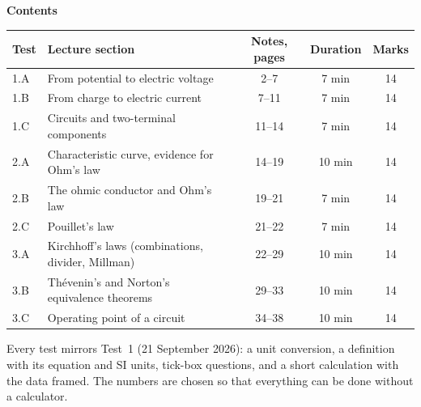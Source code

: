 \documentclass{ibetest}
\begin{document}
\vspace{6mm}
{\sffamily\bfseries Contents}\par\vspace{2mm}
\begin{center}
\begin{tabular}{@{}l l c c c@{}}
\hline
\textbf{Test} & \textbf{Lecture section} & \textbf{Notes, pages} & \textbf{Duration} &
\textbf{Marks}\\ \hline
1.A & From potential to electric voltage              & 2--7   & 7 min  & 14\\
1.B & From charge to electric current                 & 7--11  & 7 min  & 14\\
1.C & Circuits and two-terminal components            & 11--14 & 7 min  & 14\\
2.A & Characteristic curve, evidence for Ohm's law    & 14--19 & 10 min & 14\\
2.B & The ohmic conductor and Ohm's law               & 19--21 & 7 min  & 14\\
2.C & Pouillet's law                                  & 21--22 & 7 min  & 14\\
3.A & Kirchhoff's laws (combinations, divider, Millman) & 22--29 & 10 min & 14\\
3.B & Thévenin's and Norton's equivalence theorems    & 29--33 & 10 min & 14\\
3.C & Operating point of a circuit                    & 34--38 & 10 min & 14\\ \hline
\end{tabular}
\end{center}

\vspace{6mm}
\begin{tcolorbox}[enhanced, colback=black!3, colframe=black!45, boxrule=0.4pt, arc=1mm,
  fontupper=\small]
Every test mirrors Test~1 (21 September 2026): a unit conversion, a definition with its
equation and SI units, tick-box questions, and a short calculation with the data framed.
The numbers are chosen so that everything can be done without a calculator.
\end{tcolorbox}
\end{document}
